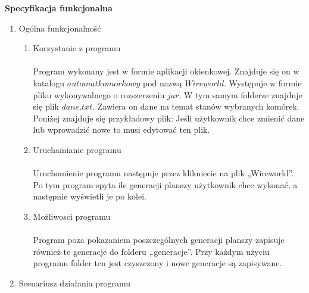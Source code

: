 \documentclass[11pt]{article}
\begin{document}
\begin{huge}
\begin{center}
\textbf{Specyfikacja funkcjonalna}\\
\end{center}
\end{huge}

 \renewcommand{\labelenumii}{\Roman{enumii}}
 \begin{enumerate}
 
 
 
 
 
\item Ogólna funkcjonalność

\begin{enumerate}[label=\arabic{enumi}.\arabic*.]
 \item  Korzystanie z programu\\
 \\Program wykonany jest w formie aplikacji okienkowej. Znajduje się on w katalogu $automat komorkowy$ pod nazwą $Wireworld$. Występuje w formie pliku wykonywalnego o rozszerzeniu $jar.$ W tym samym folderze znajduje się plik $dane.txt$. Zawiera on dane na temat stanów wybranych komórek. Poniżej znajduje się przykładowy plik:
 Jeśli użytkownik chce zmienić dane lub wprowadzić nowe to musi edytować ten plik. \\
\item  Uruchamianie programu\\
\\Uruchomienie programu następuje przez klikniecie na plik „Wireworld”. Po tym program spyta ile generacji planszy użytkownik chce wykonać, a następnie wyświetli je po kolei.\\
\item Możliwosci programu\\
\\Program poza pokazaniem poszczególnych generacji planszy zapisuje również te generacje do folderu „generacje”. Przy każdym użyciu programu folder ten jest czyszczony i nowe generacje są zapisywane.\\
\end{enumerate}



\item Scenariusz działania programu\\



\end{enumerate}
\end{document}

